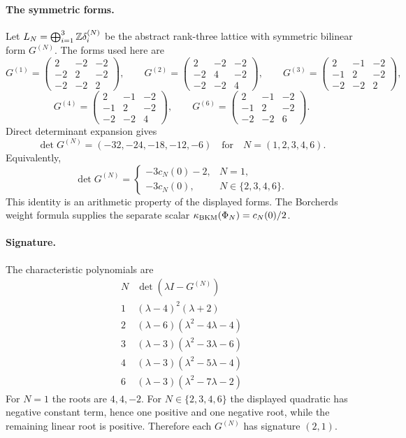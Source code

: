 \paragraph{The symmetric forms.}
Let $L_N=\bigoplus_{i=1}^{3}\mathbb{Z}\delta_i^{(N)}$ be the abstract
rank-three lattice with symmetric bilinear form $G^{(N)}$. The forms
used here are
\[
  G^{(1)}=
  \begin{pmatrix} 2&-2&-2\\ -2&2&-2\\ -2&-2&2 \end{pmatrix},
  \qquad
  G^{(2)}=
  \begin{pmatrix} 2&-2&-2\\ -2&4&-2\\ -2&-2&4 \end{pmatrix},
  \qquad
  G^{(3)}=
  \begin{pmatrix} 2&-1&-2\\ -1&2&-2\\ -2&-2&2 \end{pmatrix},
\]
\[
  G^{(4)}=
  \begin{pmatrix} 2&-1&-2\\ -1&2&-2\\ -2&-2&4 \end{pmatrix},
  \qquad
  G^{(6)}=
  \begin{pmatrix} 2&-1&-2\\ -1&2&-2\\ -2&-2&6 \end{pmatrix}.
\]
Direct determinant expansion gives
\[
  \det G^{(N)}=(-32,-24,-18,-12,-6)
  \quad\text{for}\quad N=(1,2,3,4,6).
\]
Equivalently,
\[
  \det G^{(N)}=
  \begin{cases}
    -3c_N(0)-2,& N=1,\\
    -3c_N(0),& N\in\{2,3,4,6\}.
  \end{cases}
\]
This identity is an arithmetic property of the displayed forms. The
Borcherds weight formula supplies the separate scalar
$\kappa_{\mathrm{BKM}}(\Phi_N)=c_N(0)/2$.

\paragraph{Signature.}
The characteristic polynomials are
\[
\begin{array}{c|c}
N & \det(\lambda I-G^{(N)})\\
\hline
1 & (\lambda-4)^2(\lambda+2)\\
2 & (\lambda-6)(\lambda^2-4\lambda-4)\\
3 & (\lambda-3)(\lambda^2-3\lambda-6)\\
4 & (\lambda-3)(\lambda^2-5\lambda-4)\\
6 & (\lambda-3)(\lambda^2-7\lambda-2)
\end{array}
\]
For $N=1$ the roots are $4,4,-2$. For $N\in\{2,3,4,6\}$ the displayed
quadratic has negative constant term, hence one positive and one
negative root, while the remaining linear root is positive. Therefore
each $G^{(N)}$ has signature $(2,1)$.

